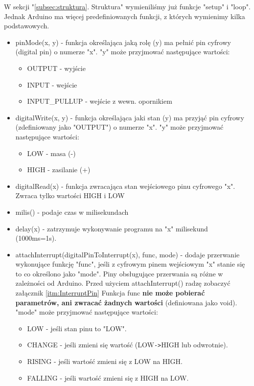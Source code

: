 \documentclass[a4paper,12pt, twoside]{article}
\begin{document}
	W sekcji "\ref{subsec:struktura}. Struktura" wymieniliśmy już funkcje "setup" i "loop". Jednak Arduino ma więcej predefiniowanych funkcji, z których wymienimy kilka podstawowych.
	\begin{itemize}
		\item pinMode(x, y) - funkcja określająca jaką rolę (y) ma pełnić pin cyfrowy (digital pin) o numerze "x". "y" może przyjmować następujące wartości:
			\begin{itemize}
				\item OUTPUT - wyjście
				\item INPUT - wejście
				\item INPUT\_PULLUP - wejście z wewn. opornikiem
			\end{itemize}
		\item digitalWrite(x, y) - funkcja określająca jaki stan (y) ma przyjąć pin cyfrowy (zdefiniowany jako "OUTPUT") o numerze "x". "y" może przyjmować następujące wartości:
			\begin{itemize}
				\item LOW - masa (-)
				\item HIGH - zasilanie (+)
			\end{itemize}
		\item digitalRead(x) - funkcja zwracająca stan wejściowego pinu cyfrowego "x". Zwraca tylko wartości HIGH i LOW
		\item milis() - podaje czas w milisekundach
		\item delay(x) - zatrzymuje wykonywanie programu na "x" milisekund (1000ms=1s).
		\item attachInterrupt(digitalPinToInterrupt(x), func, mode) - dodaje przerwanie wykonujące funkcję "func", jeśli z cyfrowym pinem wejściowym "x" stanie się to co określono jako "mode". Piny obsługujące przerwania są różne w zależności od Arduino. Przed użyciem attachInterrupt() radzę zobaczyć załącznik \ref{itm:InterruptPin} Funkcja func \textbf{nie może pobierać parametrów, ani zwracać żadnych wartości} (definiowana jako void). "mode" może przyjmować następujące wartości:
			\begin{itemize}
				\item LOW - jeśli stan pinu to "LOW".
				\item CHANGE - jeśli zmieni się wartość (LOW\verb|->|HIGH lub odwrotnie).
				\item RISING - jeśli wartość zmieni się z LOW na HIGH.
				\item FALLING - jeśli wartość zmieni się z HIGH na LOW.
			\end{itemize}

\end{itemize}
\end{document}
